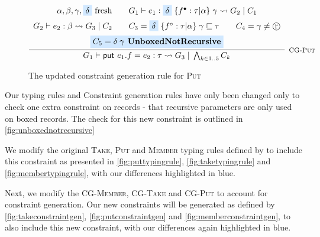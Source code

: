 \begin{figure}
    \centering
    \[
        \infer[\textsc{\footnotesize{CG-Put}}]{
            G_1 \vdash \textsf{put } e_1.f = e_2 : \tau \rightsquigarrow G_3\; 
                |\; \bigwedge_{k \in 1..5} C_k
        }{
            \begin{array}{c}
                \alpha, \beta, \gamma, \colorbox{highlighteq}{$\delta$} \text{ fresh}
                \hspace{2em}
                G_1 \vdash e_1 : \colorbox{highlighteq}{$\delta$}\; \{ f^\bullet: \tau | \alpha \}\; 
                    \gamma \rightsquigarrow G_2\; |\; C_1 \\[5pt]
                G_2 \vdash e_2 : \beta \rightsquigarrow G_3\; |\; C_2
                \hspace{2em}
                C_3 =  \colorbox{highlighteq}{$\delta$}\; \{ f^\circ : \tau | \alpha \}\; 
                    \gamma \subtype \tau
                \hspace{2em}
                C_4 = \gamma \neq \text{\textcircled{r}} \\[5pt]
                \colorbox{highlighteq}{$C_5 = \delta\; \gamma \textbf{ UnboxedNotRecursive}$}
            \end{array}
        }
    \]
    
    \caption{The updated constraint generation rule for \textsc{Put}}
    \label{fig:putconstraintgen}
\end{figure}

Our typing rules and Constraint generation rules have only been changed only to check one extra
constraint on records - that recursive parameters are only used on boxed records. The check for this
new constraint is outlined in \autoref{fig:unboxednotrecursive}

We modify the original \textsc{Take}, \textsc{Put} and \textsc{Member} typing rules defined by
\citet{LiamThesis} to include this constraint as presented in \autoref{fig:puttypingrule},
\autoref{fig:taketypingrule} and \autoref{fig:membertypingrule}, with our differences
highlighted in \colorbox{highlighteq}{blue}.

Next, we modify the \textsc{CG-Member}, \textsc{CG-Take} and \textsc{CG-Put} to account
for constraint generation. Our new constraints will be generated
as defined by \autoref{fig:takeconstraintgen}, \autoref{fig:putconstraintgen} and 
\autoref{fig:memberconstraintgen}, to also include this new constraint, with our differences
again highlighted in \colorbox{highlighteq}{blue}.

